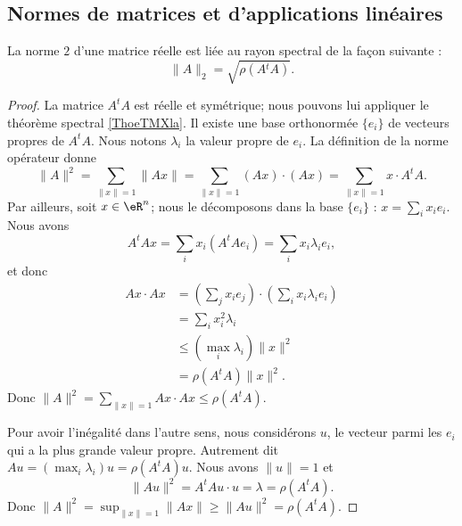 \subsection{Normes de matrices et d'applications linéaires}

\begin{theorem}       \label{THOooNDQSooOUWQrK}
	La norme \( 2\) d'une matrice réelle est liée au rayon spectral de la façon suivante :
	\begin{equation}
		\|A\|_2=\sqrt{\rho(A{^t}A)}.
	\end{equation}
\end{theorem}

\begin{proof}
	La matrice \( A^tA\) est réelle et symétrique; nous pouvons lui appliquer le théorème spectral \ref{ThoeTMXla}. Il existe une base orthonormée \( \{ e_i \}\) de vecteurs propres de \( A^tA\). Nous notons \( \lambda_i\) la valeur propre de \( e_i\). La définition de la norme opérateur donne
	\begin{equation}
		\| A \|^2=\sum_{\| x \|=1}\| Ax \|=\sum_{\| x \|=1}(Ax)\cdot (Ax)=\sum_{\| x \|=1}x\cdot A^tA.
	\end{equation}
	Par ailleurs, soit \( x\in \eR^n\); nous le décomposons dans la base \( \{ e_i \}\) : \( x=\sum_ix_ie_i\). Nous avons
	\begin{equation}
		A^tAx=\sum_ix_i(A^tAe_i)=\sum_ix_i\lambda_ie_i,
	\end{equation}
	et donc
	\begin{subequations}
		\begin{align}
			Ax\cdot Ax & =(\sum_jx_ie_j)\cdot(\sum_ix_i\lambda_ie_i) \\
			           & =\sum_ix_i^2\lambda_i                       \\
			           & \leq (\max_i\lambda_i)\| x \|^2             \\
			           & =\rho(A^tA)\| x \|^2.
		\end{align}
	\end{subequations}
	Donc \( \| A \|^2=\sum_{\| x \|=1}Ax\cdot Ax\leq \rho(A^tA)\).

	Pour avoir l'inégalité dans l'autre sens, nous considérons \( u\), le vecteur parmi les \( e_i\) qui a la plus grande valeur propre. Autrement dit \( Au=(\max_i\lambda_i)u=\rho(A^tA)u\). Nous avons \( \| u \|=1\) et
	\begin{equation}
		\| Au \|^2=A^tAu\cdot u=\lambda=\rho(A^tA).
	\end{equation}
	Donc \( \| A \|^2=\sup_{\| x \|=1}\| Ax \|\geq \| Au \|^2=\rho(A^tA)\).
\end{proof}

